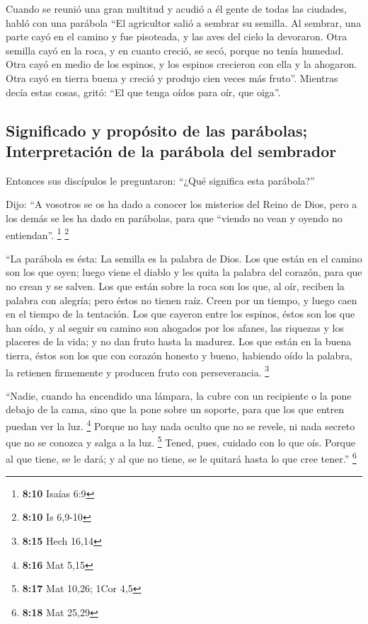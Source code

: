  Cuando se reunió una gran multitud y acudió a él gente de
todas las ciudades, habló con una parábola  ``El
agricultor salió a sembrar su semilla. Al sembrar, una parte cayó en el
camino y fue pisoteada, y las aves del cielo la devoraron.
 Otra semilla cayó en la roca, y en cuanto creció, se
secó, porque no tenía humedad.  Otra cayó en medio de los
espinos, y los espinos crecieron con ella y la ahogaron. 
Otra cayó en tierra buena y creció y produjo cien veces más fruto''.
Mientras decía estas cosas, gritó: ``El que tenga oídos para oír, que
oiga''.

\hypertarget{significado-y-propuxf3sito-de-las-paruxe1bolas-interpretaciuxf3n-de-la-paruxe1bola-del-sembrador}{%
\subsection{Significado y propósito de las parábolas; Interpretación de
la parábola del
sembrador}\label{significado-y-propuxf3sito-de-las-paruxe1bolas-interpretaciuxf3n-de-la-paruxe1bola-del-sembrador}}

 Entonces sus discípulos le preguntaron: ``¿Qué significa
esta parábola?''

 Dijo: ``A vosotros se os ha dado a conocer los misterios
del Reino de Dios, pero a los demás se les ha dado en parábolas, para
que ``viendo no vean y oyendo no entiendan''. \footnote{\textbf{8:10}
  Isaías 6:9} \footnote{\textbf{8:10} Is 6,9-10}

 ``La parábola es ésta: La semilla es la palabra de Dios.
 Los que están en el camino son los que oyen; luego viene
el diablo y les quita la palabra del corazón, para que no crean y se
salven.  Los que están sobre la roca son los que, al oír,
reciben la palabra con alegría; pero éstos no tienen raíz. Creen por un
tiempo, y luego caen en el tiempo de la tentación.  Los
que cayeron entre los espinos, éstos son los que han oído, y al seguir
su camino son ahogados por los afanes, las riquezas y los placeres de la
vida; y no dan fruto hasta la madurez.  Los que están en
la buena tierra, éstos son los que con corazón honesto y bueno, habiendo
oído la palabra, la retienen firmemente y producen fruto con
perseverancia. \footnote{\textbf{8:15} Hech 16,14}

 ``Nadie, cuando ha encendido una lámpara, la cubre con
un recipiente o la pone debajo de la cama, sino que la pone sobre un
soporte, para que los que entren puedan ver la luz. \footnote{\textbf{8:16}
  Mat 5,15}  Porque no hay nada oculto que no se revele,
ni nada secreto que no se conozca y salga a la luz. \footnote{\textbf{8:17}
  Mat 10,26; 1Cor 4,5}  Tened, pues, cuidado con lo que
oís. Porque al que tiene, se le dará; y al que no tiene, se le quitará
hasta lo que cree tener.'' \footnote{\textbf{8:18} Mat 25,29}

